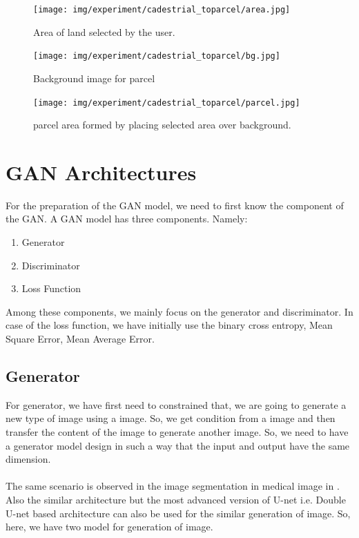         \begin{figure}
            \centering
            \begin{minipage}{.45\textwidth}
                \centering
                \texttt{[image: img/experiment/cadestrial\_toparcel/area.jpg]}
                \caption{Area of land selected by the user.}
                \label{fig:cadestrial-area}
            \end{minipage}%
            \hfill
            \begin{minipage}{.45\textwidth}
                \centering
                \texttt{[image: img/experiment/cadestrial\_toparcel/bg.jpg]}
                \caption{Background image for parcel}
                \label{fig:cadestrial-background}
            \end{minipage}
        \end{figure}
        \begin{figure}
            \centering
            \texttt{[image: img/experiment/cadestrial\_toparcel/parcel.jpg]}
            \caption{parcel area formed by placing selected area over background.}
            \label{fig:cadestrial-parcel}
        \end{figure}
        \section{GAN Architectures}\label{section:gan-architecture}
            For the preparation of the GAN model, we need to first know the component of the GAN. A GAN model has three components. Namely:
            \begin{enumerate}[label=\alph*.]
                \item Generator  
                \item Discriminator 
                \item Loss Function
            \end{enumerate}
            Among these components, we mainly focus on the generator and discriminator. In case of the loss function, we have initially use the binary cross entropy, Mean Square Error, Mean Average Error.
    
            \subsection{Generator}\label{subsection:Generator}
                For generator, we have first need to constrained that, we are going to generate a new type of image using a image. So, we get condition from a image and then transfer the content of the image to generate another image. So, we need to have a generator model design in such a way that the input and output have the same dimension.  \\\\
                The same scenario is observed in the image segmentation in medical image in \cite{ronneberger2015u}. Also the similar architecture but the most advanced version of U-net i.e. Double U-net based architecture can also be used for the similar generation of image. So, here, we have two model for generation of image. 

